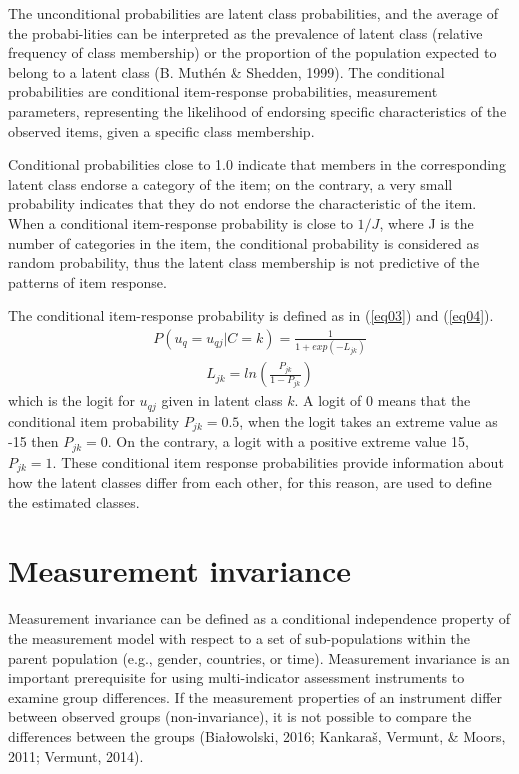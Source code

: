\documentclass[12pt,a4paper,oneside]{reedthesis}
\begin{document}
The unconditional probabilities are latent class probabilities, and the average of the probabi-lities can be interpreted as the prevalence of latent class (relative frequency of class membership) or the proportion of the population expected to belong to a latent class (B. Muthén \& Shedden, 1999). The conditional probabilities are conditional item-response probabilities, measurement parameters, representing the likelihood of endorsing specific characteristics of the observed items, given a specific class membership.

Conditional probabilities close to 1.0 indicate that members in the corresponding latent class endorse a category of the item; on the contrary, a very small probability indicates that they do not endorse the characteristic of the item. When a conditional item-response probability is close to \(1/J\), where J is the number of categories in the item, the conditional probability is considered as random probability, thus the latent class membership is not predictive of the patterns of item response.

The conditional item-response probability is defined as in (\ref{eq03}) and (\ref{eq04}).
\begin{align}
P(u_q = u_{qj}|C=k) = \frac{1}{1+exp(-L_{jk})} \label{eq03}
\end{align}
\begin{align}
L_{jk}=ln(\frac{P_{jk}}{1-P_{jk}}) \label{eq04}
\end{align}
which is the logit for \(u_{qj}\) given in latent class \(k\). A logit of 0 means that the conditional item probability \(P_{jk}=0.5\), when the logit takes an extreme value as -15 then \(P_{jk}=0\). On the contrary, a logit with a positive extreme value 15, \(P_{jk}=1\). These conditional item response probabilities provide information about how the latent classes differ from each other, for this reason, are used to define the estimated classes.

\hypertarget{measurement-invariance}{%
\section{Measurement invariance}\label{measurement-invariance}}

Measurement invariance can be defined as a conditional independence property of the measurement model with respect to a set of sub-populations within the parent population (e.g., gender, countries, or time). Measurement invariance is an important prerequisite for using multi-indicator assessment instruments to examine group differences. If the measurement properties of an instrument differ between observed groups (non-invariance), it is not possible to compare the differences between the groups (Białowolski, 2016; Kankaraš, Vermunt, \& Moors, 2011; Vermunt, 2014).
\end{document}
